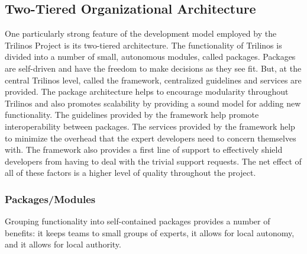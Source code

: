 \documentclass[12pt,relax]{article}
\begin{document}
\subsection{Two-Tiered Organizational Architecture}

One particularly strong feature of the development model employed by the
Trilinos Project is its two-tiered architecture.  The functionality of Trilinos
is divided into a number of small, autonomous modules, called packages. 
Packages are self-driven and have the freedom to make decisions as they see
fit.  But, at the central Trilinos level, called the framework, centralized
guidelines and services are provided.  The package architecture helps to
encourage modularity throughout Trilinos and also promotes scalability by
providing a sound model for adding new functionality.  The guidelines provided
by the framework help promote interoperability between packages.  The services
provided by the framework help to minimize the overhead that the expert
developers need to concern themselves with.  The framework also provides a
first line of support to effectively shield developers from having to deal
with the trivial support requests.  The net effect of all of these factors is
a higher level of quality throughout the project.

  \subsubsection{Packages/Modules}
  
  Grouping functionality into self-contained packages provides a number of
  benefits:  it keeps teams to small groups of experts, it allows for local
  autonomy, and it allows for local authority.
  
\end{document}
